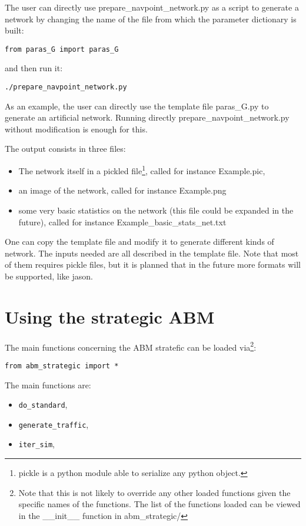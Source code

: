 \documentclass[12pt]{article}
\begin{document}
The user can directly use prepare\_navpoint\_network.py as a script to generate a network by changing the name of the file from which the parameter dictionary is built:
\begin{verbatim}
from paras_G import paras_G
\end{verbatim}
and then run it:
\begin{verbatim}
./prepare_navpoint_network.py
\end{verbatim}

As an example, the user can directly use the template file paras\_G.py to generate an artificial network. Running directly prepare\_navpoint\_network.py without modification is enough for this.

The output consists in three files: 
\begin{itemize}
\item The network itself in a pickled file\footnote{pickle is a python module able to serialize any python object.}, called for instance Example.pic,
\item an image of the network, called for instance Example.png
\item some very basic statistics on the network (this file could be expanded in the future), called for instance Example\_basic\_stats\_net.txt
\end{itemize}

One can copy the template file and modify it to generate different kinds of network. The inputs needed are all described in the template file. Note that most of them requires pickle files, but it is planned that in the future more formats will be supported, like jason.
         


\section{Using the strategic ABM}

The main functions concerning the ABM stratefic can be loaded via\footnote{Note that this is not likely to override any other loaded functions given the specific names of the functions. The list of the functions loaded can be viewed in the \_\_init\_\_ function in abm\_strategic/}:
\begin{verbatim}
from abm_strategic import *
\end{verbatim}

The main functions are:
\begin{itemize}
\item \verb|do_standard|,
\item \verb|generate_traffic|,
\item \verb|iter_sim|,
\end{itemize}
\end{document}
